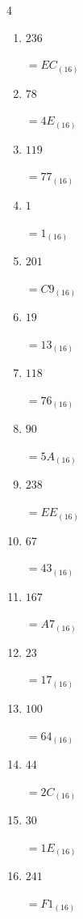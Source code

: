 \begin{multicols}{4}
\begin{enumerate}
  \item $236$

        $=EC_{(16)}$

  \item $78$

        $=4E_{(16)}$

  \item $119$

        $=77_{(16)}$

  \item $1$

        $=1_{(16)}$

  \item $201$

        $=C9_{(16)}$

  \item $19$

        $=13_{(16)}$

  \item $118$

        $=76_{(16)}$

  \item $90$

        $=5A_{(16)}$

  \item $238$

        $=EE_{(16)}$

  \item $67$

        $=43_{(16)}$

  \item $167$

        $=A7_{(16)}$

  \item $23$

        $=17_{(16)}$

  \item $100$

        $=64_{(16)}$

  \item $44$

        $=2C_{(16)}$

\columnbreak %

\resetques

  \item $30$

        $=1E_{(16)}$

  \item $241$

        $=F1_{(16)}$


\end{enumerate}
\end{multicols}
